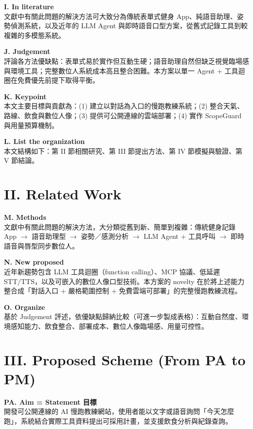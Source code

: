 \documentclass[12pt,a4paper]{article}
\begin{document}
\textbf{I. In literature} \\
文獻中有關此問題的解決方法可大致分為傳統表單式健身 App、純語音助理、姿勢偵測系統，以及近年的 LLM Agent 與即時語音口型方案，從舊式記錄工具到較複雜的多模態系統。

\textbf{J. Judgement} \\
評論各方法優缺點：表單式易於實作但互動生硬；語音助理自然但缺乏視覺臨場感與環境工具；完整數位人系統成本高且整合困難。本方案以單一 Agent + 工具迴圈在免費優先前提下取得平衡。

\textbf{K. Keypoint} \\
本文主要目標與貢獻為：(1) 建立以對話為入口的慢跑教練系統；(2) 整合天氣、路線、飲食與數位人像；(3) 提供可公開連線的雲端部署；(4) 實作 ScopeGuard 與用量預算機制。

\textbf{L. List the organization} \\
本文結構如下：第 II 節相關研究、第 III 節提出方法、第 IV 節模擬與驗證、第 V 節結論。

\section{II. Related Work}

\textbf{M. Methods} \\
文獻中有關此問題的解決方法，大分類從舊到新、簡單到複雜：傳統健身記錄 App $\rightarrow$ 語音助理型 $\rightarrow$ 姿勢／感測分析 $\rightarrow$ LLM Agent + 工具呼叫 $\rightarrow$ 即時語音與唇型同步數位人。

\textbf{N. New proposed} \\
近年新趨勢包含 LLM 工具迴圈（function calling）、MCP 協議、低延遲 STT/TTS，以及可嵌入的數位人像口型技術。本方案的 novelty 在於將上述能力整合成「對話入口 + 嚴格範圍控制 + 免費雲端可部署」的完整慢跑教練流程。

\textbf{O. Organize} \\
基於 Judgement 評述，依優缺點歸納比較（可進一步製成表格）：互動自然度、環境感知能力、飲食整合、部署成本、數位人像臨場感、用量可控性。

\section{III. Proposed Scheme (From PA to PM)}

\textbf{PA. Aim = Statement 目標} \\
開發可公開連線的 AI 慢跑教練網站，使用者能以文字或語音詢問「今天怎麼跑」，系統結合實際工具資料提出可採用計畫，並支援飲食分析與紀錄查詢。
\end{document}
